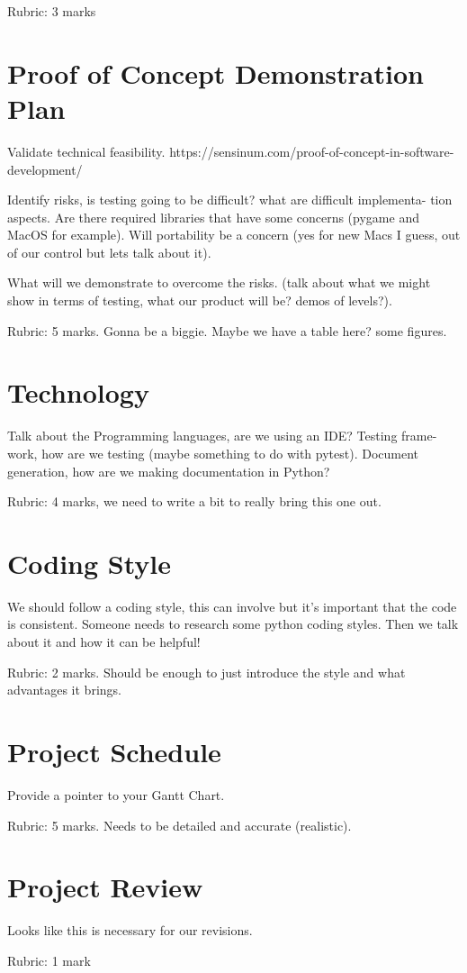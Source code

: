 \documentclass{article}
\begin{document}
Rubric:  3 marks

\section{Proof of Concept Demonstration Plan}

Validate technical feasibility.  
https://sensinum.com/proof-of-concept-in-software-
development/

Identify risks, is testing going to be difficult?  what are difficult 
implementa-
tion aspects.  Are there required libraries that have some concerns (pygame and
MacOS for example).  Will portability be a concern (yes for new Macs I guess,
out  of our control but lets talk about it).

What will we demonstrate to overcome the risks.  (talk about what we might
show in terms of testing, what our product will be?  demos of levels?).

Rubric:  5  marks.   Gonna  be  a  biggie.   Maybe  we  have  a  table  here?   
some figures.

\section{Technology}

Talk  about  the  Programming  languages,  are  we  using  an  IDE?  Testing  
frame-
work,  how  are  we  testing  (maybe  something  to  do  with  pytest).   
Document
generation, how are we making documentation in Python?

Rubric:  4 marks, we need to write a bit to really bring this one out.

\section{Coding Style}

We  should  follow  a  coding  style,  this  can  involve  but  it’s  important 
 that  the
code is consistent.  Someone needs to research some python coding styles.  Then
we talk about it and how it can be helpful!

Rubric:  2  marks.   Should  be  enough  to  just  introduce  the  style  and  
what
advantages it brings.

\section{Project Schedule}

Provide a pointer to your Gantt Chart.

Rubric:  5 marks.  Needs to be detailed and accurate (realistic).

\section{Project Review}

Looks like this is necessary for our revisions.

Rubric:  1 mark
\end{document}
